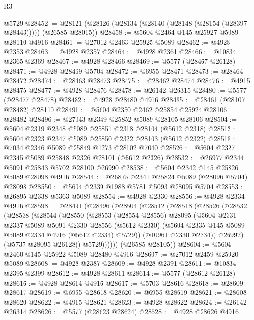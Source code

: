 \begin{lexlean}{R3}
\begin{coremodule}
    @5729
@28452 := @28121 (@28126 (@28134 (@28140 (@28148 (@28154 (@28397 @28443))))) (@26585 @28015))
@28458 := @5604 @2464 @145 @25927 @5089 @28110 @4916
@28461 := @27012 @2463 @25925 @5089
@28462 := @4928 @2353
@28463 := @4928 @2357
@28464 := @4928 @2361
@28466 := @10834 @2365 @2369
@28467 := @4928 @28466
@28469 := @5577 (@28467 @26128)
@28471 := @4928 @28469 @5704
@28472 := @6955 @28471
@28473 := @28464 @28472
@28474 := @28463 @28473
@28475 := @28462 @28474
@28476 := @4915 @28475
@28477 := @4928 @28476
@28478 := @26142 @26315
@28480 := @5577 (@28477 @28478)
@28482 := @4928 @28480 @4916
@28485 := @28461 (@28107 @28482) @28110
@28491 := @5604 @2350 @2462 @25854 @25924 @28106 @28482
@28496 := @27043 @2349 @25852 @5089 @28105 @28106
@28504 := @5604 @2319 @2348 @5089 @25851 @2318 @28104 (@5612 @2318)
@28512 := @5604 @2323 @2347 @5089 @25850 @2322 @28103 (@5612 @2322)
@28518 := @7034 @2346 @5089 @25849 @1273 @28102 @7040
@28526 := @5604 @2327 @2345 @5089 @25848 @2326 @28101 (@5612 @2326)
@28532 := @26977 @2344 @5091 @25843 @5702 @28100 @26990
@28538 := @5604 @2342 @145 @25826 @5089 @28098 @4916
@28544 := @26875 @2341 @25824 @5089 (@28096 @5704) @28098
@28550 := @5604 @2339 @1988 @5781 @5093 @28095 @5704
@28553 := @26895 @2338 @5363 @5089
@28554 := @4928 @2330
@28556 := @4928 @2334 @4916
@28598 := @28491
    (@28496
      (@28504
        (@28512
          (@28518
            (@28526
              (@28532
                (@28538
                  (@28544
                    (@28550
                      (@28553
                        (@28554 @28556)
                        @28095
                        (@5604
                          @2331
                          @2337
                          @5089
                          @5091
                          @2330
                          @28556
                          (@5612 @2330)
                          (@5604 @2335 @145 @5089 @5089 @2334 @4916 (@5612 @2334) @5729))
                        (@10961 @2330 @2334))
                      @26992)
                    (@5737 @28095 @26128))
                  @5729))))))
      (@26585 @28105))
@28604 := @5604 @2460 @145 @25922 @5089 @28480 @4916
@28607 := @27012 @2459 @25920 @5089
@28608 := @4928 @2387
@28609 := @4928 @2391
@28611 := @10834 @2395 @2399
@28612 := @4928 @28611
@28614 := @5577 (@28612 @26128)
@28616 := @4928 @28614 @4916
@28617 := @5703 @28616
@28618 := @28609 @28617
@28619 := @6955 @28618
@28620 := @6955 @28619
@28621 := @28608 @28620
@28622 := @4915 @28621
@28623 := @4928 @28622
@28624 := @26142 @26314
@28626 := @5577 (@28623 @28624)
@28628 := @4928 @28626 @4916

\end{coremodule}
\end{lexlean}
